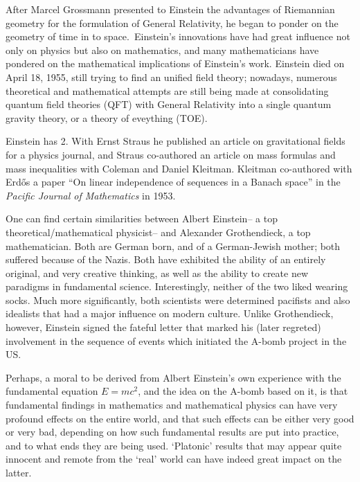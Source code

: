 \documentclass[12pt]{article}
\begin{document}
After Marcel Grossmann presented to Einstein the advantages of Riemannian geometry for the formulation of General Relativity, he began to ponder on the geometry of time in  to space.\, Einstein's innovations have had great influence not only on physics but also on mathematics, and many mathematicians have pondered on the mathematical implications of Einstein's work. Einstein died on April 18, 1955, still trying to find an unified field theory; nowadays, numerous theoretical and mathematical attempts are still being made at consolidating quantum field theories (QFT) with General Relativity into a  single quantum gravity theory, or a theory of eveything (TOE).

Einstein has  2. With Ernst Straus he published an article on gravitational fields for a physics journal, and Straus co-authored an article on mass formulas and mass inequalities with Coleman and Daniel Kleitman. Kleitman co-authored with Erd\H{o}s a paper ``On linear independence of sequences in a Banach space'' in the {\it Pacific Journal of Mathematics} in 1953.

One can find certain similarities between Albert Einstein-- a top theoretical/mathematical physicist-- and Alexander
Grothendieck, a top mathematician. Both are German born, and of a German-Jewish mother; both suffered because of the Nazis. Both have exhibited the ability of an entirely original, and very creative thinking, as well as the ability to
create new paradigms in fundamental science. Interestingly, neither of the two liked wearing socks. Much more significantly, both scientists were determined pacifists and also idealists that had a major influence on modern culture. Unlike Grothendieck, however, Einstein signed the fateful letter that marked his (later regreted) involvement in the sequence of events which initiated the A-bomb project in the US. 

Perhaps, a moral to be derived from Albert Einstein's own experience with the fundamental equation $E= mc^2$, and the idea on the A-bomb based on it, is that fundamental findings in mathematics and mathematical physics can have very profound effects on the entire world, and that such effects can be either very good or very bad, depending on how such fundamental results are put into practice, and to what ends they are being used. `Platonic' results that may appear quite innocent and remote from the `real' world can have indeed great impact on the latter.
\end{document}
